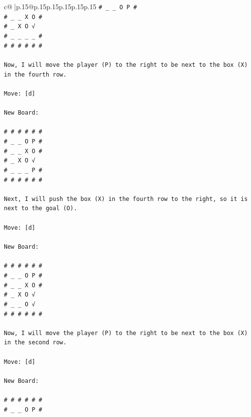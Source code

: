\documentclass{article}
\begin{document}
{\begin{supertabular}{c@{$\;$}|p{.15\linewidth}@{}p{.15\linewidth}p{.15\linewidth}p{.15\linewidth}p{.15\linewidth}p{.15\linewidth}}
{{{\texttt{\# \_ \_ O P \#} \\
\texttt{\# \_ \_ X O \#} \\
\texttt{\# \_ X O √} \\
\texttt{\# \_ \_ \_ \_ \#} \\
\texttt{\# \# \# \# \# \#} \\
\\ 
\texttt{Now, I will move the player (P) to the right to be next to the box (X) in the fourth row. } \\
\\ 
\texttt{Move: {[}d{]}} \\
\\ 
\texttt{New Board:} \\
\\ 
\texttt{\# \# \# \# \# \#} \\
\texttt{\# \_ \_ O P \#} \\
\texttt{\# \_ \_ X O \#} \\
\texttt{\# \_ X O √} \\
\texttt{\# \_ \_ \_ P \#} \\
\texttt{\# \# \# \# \# \#} \\
\\ 
\texttt{Next, I will push the box (X) in the fourth row to the right, so it is next to the goal (O). } \\
\\ 
\texttt{Move: {[}d{]}} \\
\\ 
\texttt{New Board:} \\
\\ 
\texttt{\# \# \# \# \# \#} \\
\texttt{\# \_ \_ O P \#} \\
\texttt{\# \_ \_ X O \#} \\
\texttt{\# \_ X O √} \\
\texttt{\# \_ \_ O √} \\
\texttt{\# \# \# \# \# \#} \\
\\ 
\texttt{Now, I will move the player (P) to the right to be next to the box (X) in the second row. } \\
\\ 
\texttt{Move: {[}d{]}} \\
\\ 
\texttt{New Board:} \\
\\ 
\texttt{\# \# \# \# \# \#} \\
\texttt{\# \_ \_ O P \#} \\
}}}
\end{supertabular}}
\end{document}
